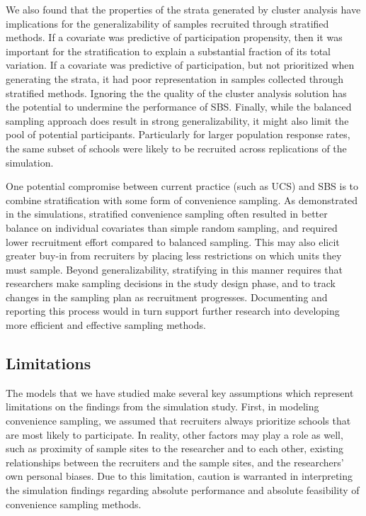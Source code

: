 \documentclass[
  man,floatsintext]{apa6}
\begin{document}
We also found that the properties of the strata generated by cluster analysis have implications for the generalizability of samples recruited through stratified methods. If a covariate was predictive of participation propensity, then it was important for the stratification to explain a substantial fraction of its total variation. If a covariate was predictive of participation, but not prioritized when generating the strata, it had poor representation in samples collected through stratified methods. Ignoring the the quality of the cluster analysis solution has the potential to undermine the performance of SBS. Finally, while the balanced sampling approach does result in strong generalizability, it might also limit the pool of potential participants. Particularly for larger population response rates, the same subset of schools were likely to be recruited across replications of the simulation.

One potential compromise between current practice (such as UCS) and SBS is to combine stratification with some form of convenience sampling. As demonstrated in the simulations, stratified convenience sampling often resulted in better balance on individual covariates than simple random sampling, and required lower recruitment effort compared to balanced sampling. This may also elicit greater buy-in from recruiters by placing less restrictions on which units they must sample.
Beyond generalizability, stratifying in this manner requires that researchers make sampling decisions in the study design phase, and to track changes in the sampling plan as recruitment progresses. Documenting and reporting this process would in turn support further research into developing more efficient and effective sampling methods.

\hypertarget{limitations}{%
\subsection*{Limitations}\label{limitations}}

The models that we have studied make several key assumptions which represent limitations on the findings from the simulation study. First, in modeling convenience sampling, we assumed that recruiters always prioritize schools that are most likely to participate. In reality, other factors may play a role as well, such as proximity of sample sites to the researcher and to each other, existing relationships between the recruiters and the sample sites, and the researchers' own personal biases.
Due to this limitation, caution is warranted in interpreting the simulation findings regarding absolute performance and absolute feasibility of convenience sampling methods.
\end{document}
